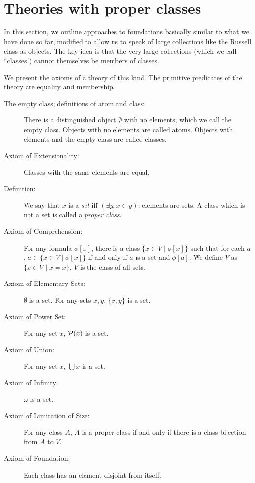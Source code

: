 \documentclass[12pt]{book}
\begin{document}
\newpage

\section{Theories with proper classes}

In this section, we outline approaches to foundations basically similar to what we have done so far, modified to allow us to speak of large collections like the Russell class as objects.  The key idea is that the very large collections (which we call ``classes") cannot themselves be members of classes.

We present the axioms of a theory of this kind.  The primitive predicates of the theory are equality and membership.

\begin{description}

\item[The empty class; definitions of atom and class:]  There is a distinguished object $\emptyset$ with no elements, which we call the empty class.  Objects with no elements are called atoms.  Objects with elements and the empty class are called classes.

\item[Axiom of Extensionality:]    Classes with the same elements are equal.

\item[Definition:]  We say that $x$ is a {\em set\/} iff $(\exists y:x \in y)$:  elements are sets.  A class which is not a set is called a {\em proper class\/}.

\item[Axiom of Comprehension:]  For any formula $\phi[x]$, there is a class $\{x \in V\mid \phi[x]\}$ such that for each $a$,
$a \in \{x \in V\mid \phi[x]\}$ if and only if $a$ is a set and $\phi[a]$.  We define $V$ as $\{x \in V\mid x=x\}$.  $V$ is the class of all sets.

\item[Axiom of Elementary Sets:]  $\emptyset$ is a set.  For any sets $x,y$, $\{x,y\}$ is a set.

\item[Axiom of Power Set:]  For any set $x$, ${\cal P}(x)$ is a set.

\item[Axiom of Union:]  For any set $x$, $\bigcup x$ is a set.

\item[Axiom of Infinity:]  $\omega$ is a set.

\item[Axiom of Limitation of Size:]  For any class $A$, $A$ is a proper class if and only if there is a class bijection from $A$ to $V$.

\item[Axiom of Foundation:]  Each class has an element disjoint from itself.

\end{description}
\end{document}
